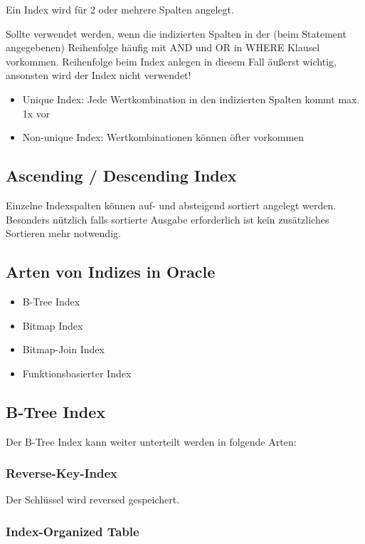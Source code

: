 Ein Index wird für 2 oder mehrere Spalten angelegt.

Sollte verwendet werden, wenn die indizierten Spalten in der (beim Statement angegebenen) Reihenfolge häufig mit AND und OR in WHERE Klausel vorkommen. Reihenfolge beim Index anlegen in diesem Fall äußerst wichtig, ansonsten wird der Index nicht verwendet!

\begin{itemize}
    \item Unique Index: Jede Wertkombination in den indizierten Spalten kommt max. 1x vor
    \item Non-unique Index: Wertkombinationen können öfter vorkommen
\end{itemize}

\subsection{Ascending / Descending Index}

Einzelne Indexspalten können auf- und absteigend sortiert angelegt werden. Besonders nützlich falls sortierte Ausgabe erforderlich ist kein zusätzliches Sortieren mehr notwendig.

\subsection{Arten von Indizes in Oracle}

\begin{itemize}
    \item B-Tree Index
    \item Bitmap Index
    \item Bitmap-Join Index
    \item Funktionsbasierter Index
\end{itemize}

\subsection{B-Tree Index}

Der B-Tree Index kann weiter unterteilt werden in folgende Arten:

\subsubsection{Reverse-Key-Index}

Der Schlüssel wird reversed gespeichert.

\subsubsection{Index-Organized Table}

